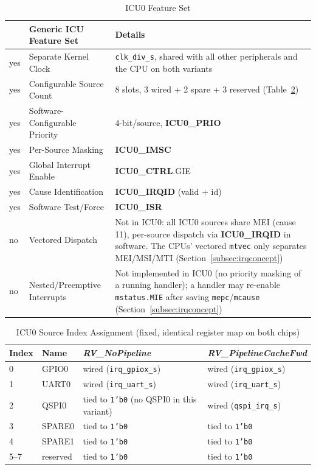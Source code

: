 \begin{table}[H]
\caption{ICU0 Feature Set}
\label{tab:asIcuPer01a}
\centering
\begin{tabularx}{\textwidth}{|l |l |X|}
  \hline
   & Generic ICU Feature Set & Details \\
  \hline
  \hline
  yes & Separate Kernel Clock    & \texttt{clk\_div\_s}, shared with all
    other peripherals and the CPU on both variants \\
  \hline
  yes & Configurable Source Count & 8 slots, 3 wired + 2 spare + 3 reserved
    (Table~\ref{tab:asIcuSrcAssign}) \\
  \hline
  yes & Software-Configurable Priority & 4-bit/source, \textbf{ICU0\_PRIO} \\
  \hline
  yes & Per-Source Masking        & \textbf{ICU0\_IMSC} \\
  \hline
  yes & Global Interrupt Enable   & \textbf{ICU0\_CTRL}.GIE \\
  \hline
  yes & Cause Identification      & \textbf{ICU0\_IRQID} (valid + id) \\
  \hline
  yes & Software Test/Force       & \textbf{ICU0\_ISR} \\
  \hline
  no  & Vectored Dispatch         & Not in ICU0: all ICU0 sources share MEI
    (cause 11), per-source dispatch via \textbf{ICU0\_IRQID} in software.
    The CPUs' vectored \texttt{mtvec} only separates MEI/MSI/MTI
    (Section~\ref{subsec:irqconcept}) \\
  \hline
  no  & Nested/Preemptive Interrupts & Not implemented in ICU0 (no priority
    masking of a running handler); a handler may re-enable
    \texttt{mstatus.MIE} after saving \texttt{mepc}/\texttt{mcause}
    (Section~\ref{subsec:irqconcept}) \\
  \hline
\end{tabularx}
\end{table}

\begin{table}[H]
\caption{ICU0 Source Index Assignment (fixed, identical register map on both chips)}
\label{tab:asIcuSrcAssign}
\centering
\begin{tabularx}{\textwidth}{|l |l |X |X|}
  \hline
  Index & Name & \textit{RV\_NoPipeline} & \textit{RV\_PipelineCacheFwd} \\
  \hline
  \hline
  0 & GPIO0 & wired (\texttt{irq\_gpiox\_s}) & wired (\texttt{irq\_gpiox\_s}) \\
  \hline
  1 & UART0 & wired (\texttt{irq\_uart\_s}) & wired (\texttt{irq\_uart\_s}) \\
  \hline
  2 & QSPI0 & tied to \texttt{1'b0} (no QSPI0 in this variant) & wired
    (\texttt{qspi\_irq\_s}) \\
  \hline
  3 & SPARE0 & tied to \texttt{1'b0} & tied to \texttt{1'b0} \\
  \hline
  4 & SPARE1 & tied to \texttt{1'b0} & tied to \texttt{1'b0} \\
  \hline
  5--7 & reserved & tied to \texttt{1'b0} & tied to \texttt{1'b0} \\
  \hline
\end{tabularx}
\end{table}

